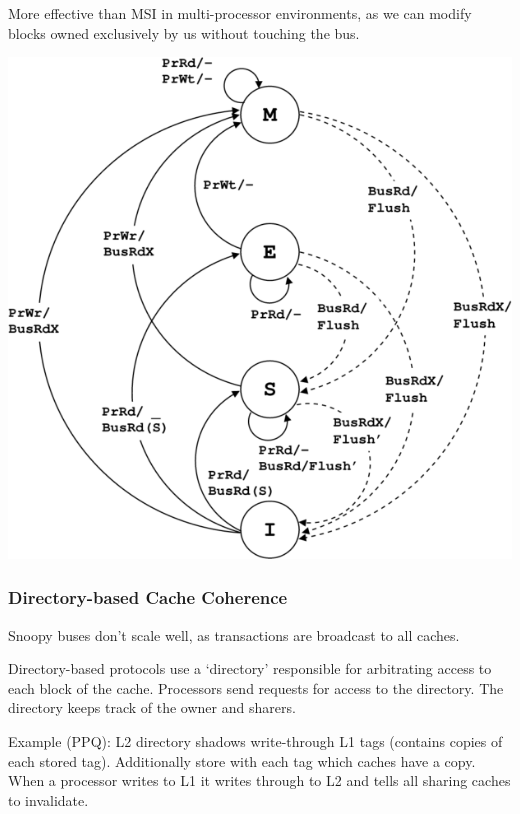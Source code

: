 \documentclass[a4paper,11pt]{article}
\begin{document}
{{{\begin{minipage}[t]{0.35\textwidth}
            More effective than MSI in multi-processor environments, as we can modify blocks owned exclusively by us without touching the bus.
            \end{minipage}
            \begin{minipage}[t]{0.55\textwidth}
            \vspace{0pt}
            \centering
            \includegraphics[width=\textwidth]{mesi.png}
            \end{minipage}
        }
        \subsubsection*{Directory-based Cache Coherence}
        {
            Snoopy buses don't scale well, as transactions are broadcast to all caches.

            Directory-based protocols use a `directory' responsible for arbitrating access to each block of the cache. Processors send requests for access to the directory. The directory keeps track of the owner and sharers.

            Example (PPQ): L2 directory shadows write-through L1 tags (contains copies of each stored tag). Additionally store with each tag which caches have a copy. When a processor writes to L1 it writes through to L2 and tells all sharing caches to invalidate.
        }
    }
}
\end{document}
